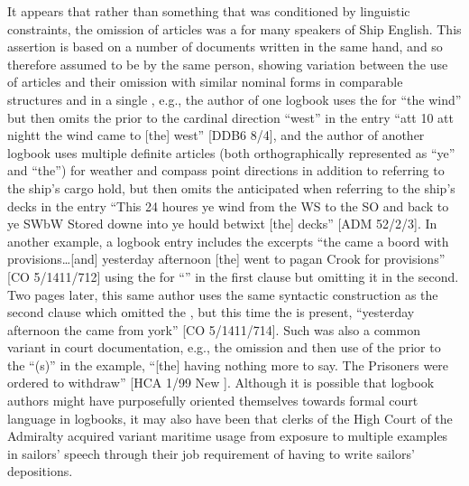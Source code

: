 It appears that rather than something that was conditioned by linguistic constraints, the omission of articles was a  for many speakers of Ship English. This assertion is based on a number of documents written in the same hand, and so therefore assumed to be by the same person, showing variation between the use of articles and their omission with similar nominal forms in comparable structures and in a single , e.g., the author of one logbook uses the  for “the wind” but then omits the  prior to the cardinal direction “west” in the entry “att 10 att nightt the wind came to [the] west” [DDB6 8/4], and the author of another logbook uses multiple definite articles (both orthographically represented as “ye” and “the”) for weather and compass point directions in addition to referring to the ship’s cargo hold, but then omits the anticipated  when referring to the ship’s decks in the entry “This 24 houres ye wind from the WS to the SO and back to ye SWbW Stored downe into ye hould betwixt [the] decks” [ADM 52/2/3]. In another example, a logbook entry includes the excerpts “the  came a boord with provisions…[and] yesterday afternoon [the]  went to pagan Crook for provisions” [CO 5/1411/712] using the  for “” in the first clause but omitting it in the second. Two pages later, this same author uses the same syntactic construction as the second clause which omitted the , but this time the  is present, “yesterday afternoon the  came from york” [CO 5/1411/714]. Such  was also a common variant in court documentation, e.g., the omission and then use of the  prior to the  “(s)” in the example, “[the]  having nothing more to say. The Prisoners were ordered to withdraw” [HCA 1/99 New \citealt{Providence1722}]. Although it is possible that logbook authors might have purposefully oriented themselves towards formal court language in logbooks, it may also have been that clerks of the High Court of the Admiralty acquired variant maritime usage from exposure to multiple examples in sailors’ speech through their job requirement of having to write sailors’ depositions. 

